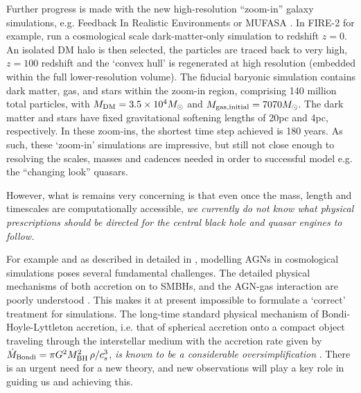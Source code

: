 \smallskip 
\smallskip
\noindent 
Further progress is made with the new high-resolution ``zoom-in''
galaxy simulations, e.g. Feedback In Realistic Environments
\citep[FIRE-2;][]{Wetzel2016, Hopkins2017} or MUFASA
\citep[][]{Dave2016}.  In FIRE-2 for example, \citet{Wetzel2016} run a
cosmological scale dark-matter-only simulation to redshift $z=0$. An
isolated DM halo is then selected, the particles are traced back to
very high, $z=100$ redshift and the `convex hull' is regenerated at
high resolution (embedded within the full lower-resolution volume).
The fiducial baryonic simulation contains dark matter, gas, and stars
within the zoom-in region, comprising 140 million total particles,
with $M_{\rm DM} =3.5\times10^{4} M_{\odot}$ and $M_{\rm gas,initial}
= 7070 M_{\odot}$.  The dark matter and stars have fixed gravitational
softening lengths of 20pc and 4pc, respectively.  In these zoom-ins,
the shortest time step achieved is 180 years.  As such, these
`zoom-in' simulations are impressive, but still not close enough to
resolving the scales, masses and cadences needed in order to
successful model e.g. the ``changing look'' quasars.

\smallskip 
\smallskip
\noindent 
However, what is remains very concerning is that even once the mass,
length and timescales are computationally accessible, {\it we
currently do not know what physical prescriptions should be directed
for the central black hole and quasar engines to follow.}

\smallskip
\smallskip
\noindent
For example and as described in detailed in \citet{Weinberger2017},
modelling AGNs in cosmological simulations poses several fundamental
challenges. The detailed physical mechanisms of both accretion on to
SMBHs, and the AGN-gas interaction are poorly understood
\citep{Hopkins_Quataert2010, Hopkins_Quataert2011,
Huarte-Espinosa2011, Gaibler2012, Angles-Alcazar2013, Gaspari2013,
Cielo2014, Costa2014, Angles-Alcazar2015, Emsellem2015,
CurtisSijacki2015, CurtisSijacki2016a, CurtisSijacki2016b,
Rosas-Guevara2015, Roos2015, Hopkins2016, Bieri2017,
Angles-Alcazar2017}. This makes it at present impossible to formulate
a `correct' treatment for simulations.  The long-time standard
physical mechanism of Bondi-Hoyle-Lyttleton accretion, i.e. that of
spherical accretion onto a compact object traveling through the
interstellar medium \citep{Hoyle_Lyttleton1939, Bondi_Hoyle1944,
Bondi1952} with the accretion rate given by $\dot {M}_{\rm Bondi} =
\pi G^{2 }M_{\rm BH}^{2} \, \rho / c_{s}^{3}$, {\it is known to
be a considerable oversimplification} \citep[e.g.,][]{Edgar2004}.
There is an urgent need for a new theory, and new observations will 
play a key role in guiding us and achieving this.




